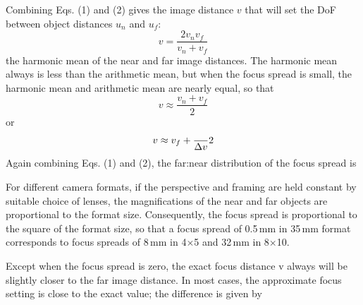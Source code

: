 \documentclass[11pt, oneside]{scrartcl}   	%
\newcommand{\Dv}{\ensuremath{\Delta v}}
\begin{document}
Combining Eqs. (1) and (2) gives the image distance $v$ that will set
the DoF between object distances $u_n$ and $u_f$:
\begin{equation}
  \label{eq:v}
  v =  \frac{2v_nv_f}{v_n+v_f}
\end{equation}
the harmonic mean of the near and far image distances. The harmonic mean always is less than the arithmetic mean, but when the focus spread is small, the harmonic mean and arithmetic mean are nearly equal, so that
\begin{equation}
  \label{eq:vapprox1}
  v\approx\frac{v_n+v_f}2
\end{equation}
or
\begin{equation}
  \label{eq:vapprox2}
  v \approx v_f + \frac \Dv 2
\end{equation}
Again combining Eqs. (1) and (2), the far:near distribution of the focus spread is

For different camera formats, if the perspective and framing are held constant by suitable choice of lenses, the magnifications of the near and far objects are proportional to the format size. Consequently, the focus spread is proportional to the square of the format size, so that a focus spread of 0.5\,mm in 35\,mm format corresponds to focus spreads of 8\,mm in 4$\times$5 and 32\,mm in 8$\times$10.

Except when the focus spread is zero, the exact focus distance v always will be slightly closer to the far image distance. In most cases, the approximate focus setting is close to the exact value; the difference is given by
\end{document}
